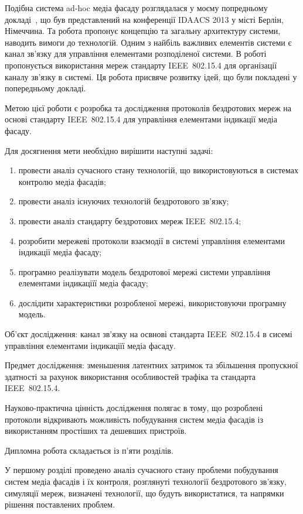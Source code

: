 \documentclass[a4paper,ukrainian,utf8,nocolumnsxix,floatsection,equationsection]{eskdtext}
\newcommand{\iee}[0]{IEEE~802.15.4\xspace}
\begin{document}
Подібна система ad-hoc медіа фасаду розглядалася у моєму попредньому докладі~\cite{idaacs:2013:adhoc:media:facade}, що був представлений на конференції IDAACS 2013 у місті Берлін, Німеччина. Та робота пропонує концепцію та загальну архитектуру системи, наводить вимоги до технологій. Одним з найбіль важливих елементів системи є канал зв’язку для управління елементами розподіленої системи. В роботі пропонується використання мереж стандарту \iee для організації каналу зв’язку в системі. Ця робота присвяче розвитку ідей, що були покладені у попередньому докладі.

Метою цієї роботи є розробка та дослідження протоколів бездротових мереж на основі стандарту \iee для управління елементами індикації медіа фасаду.

Для досягнення мети необхідно вирішити наступні задачі:
\begin{enumerate}
	\item провести аналіз сучасного стану технологій, що використовуються в системах контролю медіа фасадів;
	\item провести аналіз існуючих технологій бездротового зв’язку;
	\item провести аналіз стандарту бездротових мереж \iee;
	\item розробити мережеві протоколи взаємодії в системі управління елементами індикації медіа фасаду;
	\item\label{task:create_model} програмно реалізувати модель бездротової мережі системи управління елементами індикаціїї медіа фасаду;
	\item\label{task:do_simulation} дослідити характеристики розробленої мережі, використовуючи програмну модель.
\end{enumerate}

Об’єкт дослідження: канал зв’язку на освнові стандарта \iee в сисемі управління елементами індикаціїї медіа фасаду.

Предмет дослідження: зменьшення латентних затримок та збільшення пропускної здатності за рахунок використання особливостей трафіка та стандарта \iee.

Науково-практична цінність дослідження полягає в тому, що розроблені протоколи відкривають можливість побудування систем медіа фасадів із використанням простіших та дешевших пристроїв.

Дипломна робота складається із п’яти розділів.

У першому розділі проведено аналіз сучасного стану проблеми побудування систем медіа фасадів і їх контроля, розглянуті технології бездротового зв’язку, симуляції мереж, визначені технології, що будуть використатися, та напрямки рішення поставлених проблем.
\end{document}
